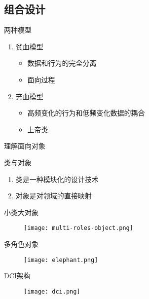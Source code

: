 \subsection{组合设计}

\begin{frame}{两种模型}
    \begin{enumerate}
    \item \alert{贫血模型}
        \begin{itemize}
        \item 数据和行为的完全分离
        \item 面向过程
        \end{itemize}
    \item \alert{充血模型}
        \begin{itemize}
        \item 高频变化的行为和低频变化数据的耦合
        \item 上帝类
        \end{itemize}
    \end{enumerate}
\end{frame}

\begin{frame}{理解面向对象}
  \begin{block}{类与对象}
    \begin{enumerate}
      \item \alert{类是一种模块化的设计技术}
      \item \alert{对象是对领域的直接映射}
    \end{enumerate}
  \end{block}
\end{frame}

\begin{frame}{小类大对象}
  \begin{figure}
    \centering
    \texttt{[image: multi-roles-object.png]}
  \end{figure}
\end{frame}

\begin{frame}{多角色对象}
  \begin{figure}
    \centering
    \texttt{[image: elephant.png]}
  \end{figure}
\end{frame}

\begin{frame}{DCI架构}
  \begin{figure}
    \centering
    \texttt{[image: dci.png]}
  \end{figure}
\end{frame}

